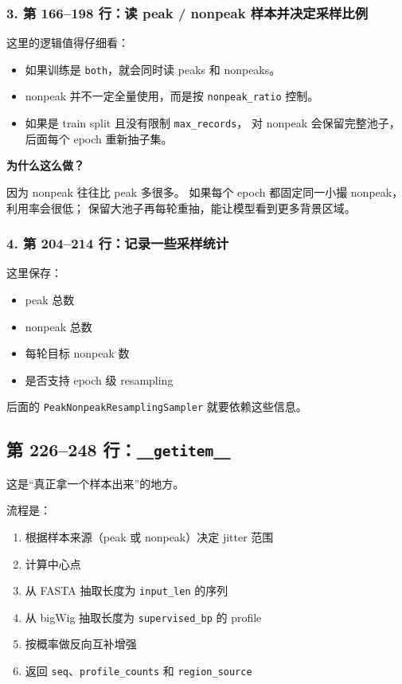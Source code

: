 \documentclass[11pt,a4paper]{ctexart}
\begin{document}
\subsubsection*{3. 第 166--198 行：读 peak / nonpeak 样本并决定采样比例}

这里的逻辑值得仔细看：

\begin{itemize}[leftmargin=2em]
\item 如果训练是 \texttt{both}，就会同时读 peaks 和 nonpeaks。
\item nonpeak 并不一定全量使用，而是按 \texttt{nonpeak\_ratio} 控制。
\item 如果是 train split 且没有限制 \texttt{max\_records}，
  对 nonpeak 会保留完整池子，后面每个 epoch 重新抽子集。
\end{itemize}

\textbf{为什么这么做？}

因为 nonpeak 往往比 peak 多很多。
如果每个 epoch 都固定同一小撮 nonpeak，利用率会很低；
保留大池子再每轮重抽，能让模型看到更多背景区域。

\subsubsection*{4. 第 204--214 行：记录一些采样统计}

这里保存：

\begin{itemize}[leftmargin=2em]
\item peak 总数
\item nonpeak 总数
\item 每轮目标 nonpeak 数
\item 是否支持 epoch 级 resampling
\end{itemize}

后面的 \texttt{PeakNonpeakResamplingSampler} 就要依赖这些信息。

\subsection{第 226--248 行：\texttt{\_\_getitem\_\_}}

这是“真正拿一个样本出来”的地方。

流程是：

\begin{enumerate}[leftmargin=2em]
\item 根据样本来源（peak 或 nonpeak）决定 jitter 范围
\item 计算中心点
\item 从 FASTA 抽取长度为 \texttt{input\_len} 的序列
\item 从 bigWig 抽取长度为 \texttt{supervised\_bp} 的 profile
\item 按概率做反向互补增强
\item 返回 \texttt{seq}、\texttt{profile\_counts} 和 \texttt{region\_source}
\end{enumerate}
\end{document}
